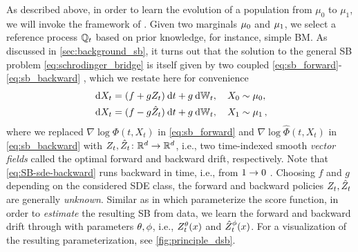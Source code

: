 As described above, in order to learn the evolution of a population from $\mu_0$ to $\mu_1$, we will invoke the framework of .
Given two marginals $\mu_0$ and $\mu_1$, we select a reference process $\mathbb{Q}_{ t }$ based on prior knowledge, for instance, simple \acrlong{BM}. As discussed in \cref{sec:background_sb}, it turns out that  the solution to the general \acrshort{SB} problem \eqref{eq:schrodinger_bridge} is itself given by two coupled  \eqref{eq:sb_forward}-\eqref{eq:sb_backward} \citep{leonard2013survey}, which we restate here for convenience
\begin{eqnarray}
\label{eq:SB-sde-forward}
\dsde &= \parens*{\tdriftbase +  \volatbase \SBfbase_\ctime} \dt + \volatbase \dWiener[\ctime],\quad \sde[0] \sim \distinit, \\ %
\label{eq:SB-sde-backward}
\dsde &= \parens{\tdriftbase -  \volatbase \SBbbase_\ctime} \dt + \volatbase \dWiener[\ctime],\quad \sde[\horizon] \sim \distend\,, %
\end{eqnarray}
where we replaced $\nabla \log \Phi\left(t, X_t\right)$ in \eqref{eq:sb_forward} and $\nabla \log \widehat{\Phi}\left(t, X_t\right)$ in \eqref{eq:sb_backward} with $Z_t, \hat{Z}_t \colon \mathbb{R}^d \to \mathbb{R}^d$, i.e., two time-indexed smooth \emph{vector fields} called the optimal forward and backward drift, respectively. Note that \eqref{eq:SB-sde-backward} runs backward in time, i.e., from $1 \to 0$ \citep{anderson1982reverse}. %
Choosing $f$ and $g$ depending on the considered \acrshort{SDE} class, the forward and backward policies $Z_t, \hat{Z}_t$ are generally \emph{unknown}.
Similar as in  \citep{song2020score, hyvarinen2005estimation} which parameterize the score function, in order to \emph{estimate} the resulting \acrshort{SB} from data, we learn the forward and backward drift through  with parameters $\theta, \phi$, i.e., $\SBf$ and $\SBb$. For a visualization of the resulting parameterization, see \cref{fig:principle_dsb}. \\


